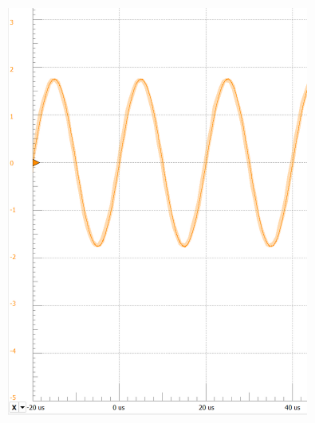 \documentclass[12pt]{article}
\begin{document}
\includegraphics[width=4.61435in,height=4.23958in]{media/image10.png}
\end{document}
